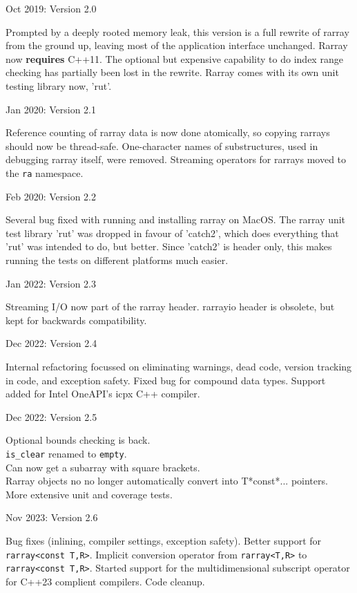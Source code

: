 \documentclass[11pt,twoside]{article}
\begin{document}
\noindent
Oct 2019: Version 2.0

Prompted by a deeply rooted memory leak, this version is a full
rewrite of rarray from the ground up, leaving most of the application
interface unchanged.  Rarray now \textbf{requires} C++11.
The optional but expensive capability to do index range checking has
partially been lost in the rewrite.  Rarray comes with its own unit testing
library now, 'rut'.

\noindent
Jan 2020: Version 2.1

Reference counting of rarray data is now done atomically, so copying
rarrays should now be thread-safe.  One-character names of
substructures, used in debugging rarray itself, were
removed. Streaming operators for rarrays moved to the \texttt{ra}
namespace.

\noindent
Feb 2020: Version 2.2

Several bug fixed with running and installing rarray on MacOS.  The
rarray unit test library 'rut' was dropped in favour of 'catch2',
which does everything that 'rut' was intended to do, but better. Since
'catch2' is header only, this makes running the tests on different
platforms much easier.

\noindent
Jan 2022: Version 2.3

Streaming I/O now part of the rarray header. rarrayio header is
obsolete, but kept for backwards compatibility. 

\noindent
Dec 2022: Version 2.4

Internal refactoring focussed on eliminating warnings, dead code,
version tracking in code, and exception safety.
Fixed bug for compound data types.
Support added for Intel OneAPI's icpx C++ compiler.

\noindent
Dec 2022: Version 2.5

Optional bounds checking is back.\\
\texttt{is\_clear} renamed to \texttt{empty}.\\
Can now get a subarray with square brackets.\\
Rarray objects no no longer automatically convert into T*const*... pointers.\\
More extensive unit and coverage tests.

\noindent
Nov 2023: Version 2.6

Bug fixes (inlining, compiler settings, exception safety).  Better
support for \texttt{rarray<const T,R>}.  Implicit conversion operator
from \texttt{rarray<T,R>} to \texttt{rarray<const T,R>}.  Started
support for the multidimensional subscript operator for C++23 complient compilers.
Code cleanup.
\end{document}
